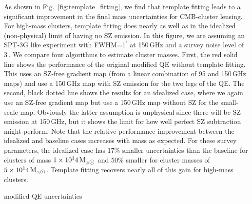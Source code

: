 
As shown in Fig.~\ref{fig:template_fitting}, we find that template fitting leads to a significant improvement in the final mass uncertainties for CMB-cluster lensing. 
For high-mass clusters, template fitting does nearly as well as in the idealized (non-physical) limit of having no SZ emission. 
In this figure, we are assuming an SPT-3G like experiment with FWHM=1$^\prime$ at 150\,GHz and a survey noise level of 3\,\ukarcmin{}. 
We compare four algorithms to estimate cluster masses.  
First, the red solid line shows the performance of the original modified QE without template fitting. 
This uses  an SZ-free gradient map 
(from a linear combination of 95 and 150\,GHz maps) and use a 150\,GHz map with SZ emission for the two legs of the QE. 
The second, black dotted line shows the results for an idealized case, where we again use an SZ-free gradient map but use a 150\,GHz map without SZ for the small-scale map. 
Obviously the latter assumption is unphysical since there will be SZ emission at 150\,GHz, but it shows the limit for how well perfect SZ subtraction might perform. 
Note that the relative performance improvement between the idealized and baseline cases increases with mass as expected. 
For these survey parameters, the idealized case has 17\% smaller uncertainties than the baseline for clusters of mass $1\times 10^14\,\msolar$ and 50\% smaller for cluster masses of $5\times 10^14\,\msolar$. 
Template fitting recovers nearly all of this gain for high-mass clusters. 


modified QE uncertainties 


